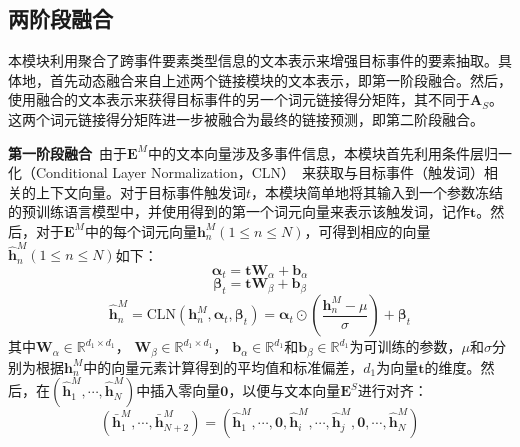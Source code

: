 \subsection{两阶段融合}
\label{two-fold}
本模块利用聚合了跨事件要素类型信息的文本表示来增强目标事件的要素抽取。具体地，首先动态融合来自上述两个链接模块的文本表示，即第一阶段融合。然后，使用融合的文本表示来获得目标事件的另一个词元链接得分矩阵，其不同于$\boldsymbol{A}_{S}$。这两个词元链接得分矩阵进一步被融合为最终的链接预测，即第二阶段融合。

\textbf{第一阶段融合}~由于$\boldsymbol{E}^{M}$中的文本向量涉及多事件信息，本模块首先利用条件层归一化（Conditional Layer Normalization，CLN）~\cite{yu2021semi,xu2022extracting}来获取与目标事件（触发词）相关的上下文向量。对于目标事件触发词$t$，本模块简单地将其输入到一个参数冻结的预训练语言模型中，并使用得到的第一个词元向量来表示该触发词，记作$\boldsymbol{t}$。然后，对于$\boldsymbol{E}^{M}$中的每个词元向量$\boldsymbol{h}_{n}^{M} \left(1 \leq n \leq N\right)$，可得到相应的向量$\boldsymbol{\hat{h}}_{n}^{M} \left(1 \leq n \leq N\right)$如下：
\begin{equation}
    \boldsymbol{\alpha}_{t}=\boldsymbol{t}\boldsymbol{W}_\alpha+\boldsymbol{b}_\alpha
\end{equation}
\begin{equation}
    \boldsymbol{\beta}_{t}=\boldsymbol{t}\boldsymbol{W}_\beta+\boldsymbol{b}_\beta
\end{equation}
\begin{equation}
    \boldsymbol{\hat{h}}_{n}^{M} = \textrm{CLN}(\boldsymbol{h}_{n}^{M}, \boldsymbol{\alpha}_{t}, \boldsymbol{\beta}_{t})=\boldsymbol{\alpha}_{t} \odot\left(\frac{\boldsymbol{h}_{n}^{M}-\mu}{\sigma}\right)+\boldsymbol{\beta}_{t}
\end{equation}
其中$\boldsymbol{W}_\alpha \in {\mathbb{R}}^{d_{1} \times d_{1}}$， $\boldsymbol{W}_\beta \in {\mathbb{R}}^{d_{1} \times d_{1}}$， $\boldsymbol{b}_\alpha \in {\mathbb{R}}^{d_{1}}$和$\boldsymbol{b}_\beta \in {\mathbb{R}}^{d_{1}}$为可训练的参数，$\mu$和$\sigma$分别为根据$\boldsymbol{h}_{n}^{M}$中的向量元素计算得到的平均值和标准偏差，$d_{1}$为向量$\boldsymbol{t}$的维度。然后，在$(\boldsymbol{\hat{h}}_{1}^{M}, \cdots, \boldsymbol{\hat{h}}_{N}^{M})$中插入零向量$\boldsymbol{0}$，以便与文本向量$\boldsymbol{E}^{S}$进行对齐：
\begin{equation}
(\boldsymbol{\bar{h}}_{1}^{M}, \cdots, \boldsymbol{\bar{h}}_{N+2}^{M}) = (\boldsymbol{\hat{h}}_{1}^{M}, \cdots, \boldsymbol{0}, \boldsymbol{\hat{h}}_{i}^{M}, \cdots, \boldsymbol{\hat{h}}_{j}^{M}, \boldsymbol{0}, \cdots, \boldsymbol{\hat{h}}_{N}^{M})
\end{equation} 
